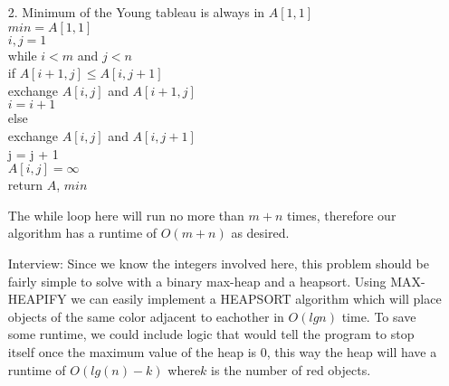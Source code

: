 \documentclass{article}
\begin{document}
\begin{flushleft}
\begin{enumerate}
\item[2.] Minimum of the Young tableau is always in $A[1,1]$\\
$min = A[1,1]$\\
$i,j= 1$\\
while $i < m$ and $j < n$\\
\quad if $A[i + 1, j] \leq A[i, j+1]$\\
\quad \quad exchange $A[i,j]$ and $A[i + 1,j]$\\
\quad\quad $i = i + 1$\\
\quad else\\
\quad \quad exchange $A[i,j]$ and $A[i ,j+1]$\\
\quad  \quad j = j + 1\\
$A[i,j] = \infty$\\
return $A$, $min$\par
\bigskip
The while loop here will run no more than $m + n$ times, therefore our algorithm has a runtime of $O(m + n)$ as desired.

\item[Interview:] Since we know the integers involved here, this problem should be fairly simple to solve with a binary max-heap and a heapsort. Using MAX-HEAPIFY we can easily implement a HEAPSORT algorithm which will place objects of the same color adjacent to eachother in $O(lgn)$ time. To save some runtime, we could include logic that would tell the program to stop itself once the maximum value of the heap is 0, this way the heap will have a runtime of $O(lg(n) - k)$ where$ k$ is the number of red objects. 
\end{enumerate}
\end{flushleft}
\end{document}
